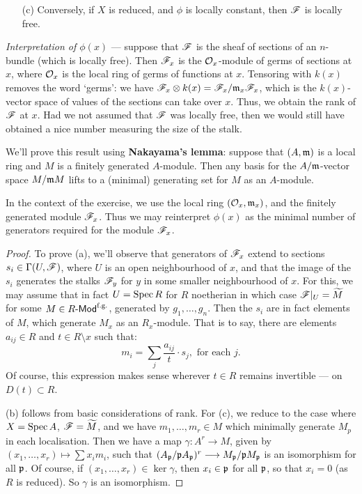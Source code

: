 \documentclass[11pt]{article}
\newcommand{\INDENT}{\textbf{}\hspace{4mm}}
\newcommand{\Index}[1]{\index{#1}#1}
\begin{document}
\begin{itemise}
\begin{enumerate}
\item[(c)] Conversely, if $X$ is reduced, and $\phi$ is locally constant, then
$\mathscr{F}$ is locally free.
\end{enumerate}
\emph{Interpretation of $\phi(x)$} --- suppose that $\mathscr{F}$ is the sheaf of
sections of an $n$-bundle (which is locally free). Then $\mathscr{F}_x$ is the
$\mathcal{O}_x$-module of germs of sections at $x$, where $\mathcal{O}_x$ is the local ring
of germs of functions at $x$. Tensoring with $k(x)$ removes the word `germs': we
have $\mathscr{F}_x\otimes k(x)=\mathscr{F}_x/\mathfrak{m}_x\mathscr{F}_x$, which is the $k(x)$-vector
space of values of the sections can take over $x$. Thus, we obtain the rank of
$\mathscr{F}$ at $x$. Had we not assumed that $\mathscr{F}$ was locally free, then we would
still have obtained a nice number measuring the size of the stalk.

\INDENT We'll prove this result using \textbf{\Index{Nakayama's lemma}}: suppose
that $(A,\mathfrak{m})$ is a local ring and $M$ is a finitely generated $A$-module.
Then any basis for the $A/\mathfrak{m}$-vector space $M/\mathfrak{m} M$ lifts to a (minimal)
generating set for $M$ as an $A$-module.

\INDENT In the context of the exercise, we use the local ring
$(\mathcal{O}_x,\mathfrak{m}_x)$, and the finitely generated module $\mathscr{F}_x$. Thus we may
reinterpret $\phi(x)$ as the minimal number of generators required for the
module $\mathscr{F}_x$.

\begin{proof} To prove (a), we'll observe that generators of $\mathscr{F}_x$ extend to
sections $s_i\in\Gamma(U,\mathscr{F})$, where $U$ is an open neighbourhood of $x$, and
that the image of the $s_i$ generates the stalks $\mathscr{F}_y$ for $y$ in some
smaller neighbourhood of $x$. For this, we may assume that in fact $U=\operatorname{Spec} R$
for $R$ noetherian in which case $\mathscr{F}|_U=\widetilde M$ for some $M\in
R\operatorname{{\mathsf{\!-Mod}}}^\text{f.g.}$, generated by $g_1,\ldots,g_n$. Then the $s_i$ are in
fact elements of $M$, which generate $M_x$ as an $R_x$-module. That is to say,
there are elements $a_{ij}\in R$ and $t\in R\setminus x$ such that:
\[m_i=\sum_{j}\frac{a_{ij}}{t}\cdot s_j, \text{ for each $j$}.\]
Of course, this expression makes sense wherever $t\in R$ remains invertible ---
on $D(t)\subset R$.

(b) follows from basic considerations of rank. For (c), we reduce to the case
where $X=\operatorname{Spec} A$, $\mathscr{F}=\widetilde M$, and we have $m_1,\ldots,m_r\in M$ which
minimally generate $M_p$ in each localisation. Then we have a map $\gamma:A^r\to
M$, given by $(x_1,\ldots,x_r)\mapsto \sum x_im_i$, such that $(A_{\mathfrak{p}}/\mathfrak{p}
A_{\mathfrak{p}})^r\longrightarrow M_{\mathfrak{p}}/\mathfrak{p} M_{\mathfrak{p}}$ is an isomorphism for all $\mathfrak{p}$. Of
course, if $(x_1,\ldots,x_r)\in\ker\gamma$, then $x_i\in\mathfrak{p}$ for all
$\mathfrak{p}$, so that $x_i=0$ (as $R$ is reduced). So $\gamma$ is an isomorphism.
\end{proof}
\end{itemise}
\end{document}
